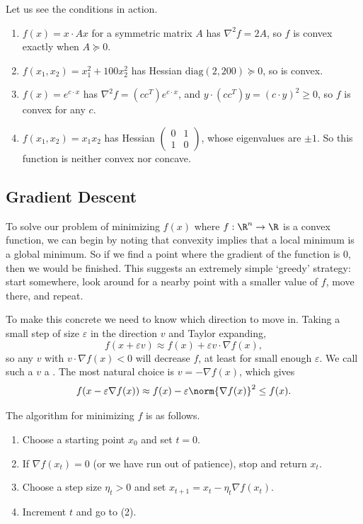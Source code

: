 \begin{example}
    Let us see the conditions in action.
    \begin{enumerate}[label=(\roman*)]
        \item $f(x) = x \cdot Ax$ for a symmetric matrix $A$ has $\nabla^2 f = 2A$, so $f$ is convex exactly when $A \succeq 0$.
        \item $f(x_1, x_2) = x_1^2 + 100 x_2^2$ has Hessian $\mathrm{diag}(2, 200) \succeq 0$, so is convex.
        \item $f(x) = e^{c \cdot x}$ has $\nabla^2 f = (cc^{T}) e^{c\cdot x}$, and $y \cdot (cc^T) y = (c \cdot y)^2 \geq 0$, so $f$ is convex for any $c$.
        \item $f(x_1, x_2) = x_1 x_2$ has Hessian $\begin{pmatrix} 0 & 1 \\ 1 & 0\end{pmatrix}$, whose eigenvalues are $\pm 1$. So this function is neither convex nor concave.
    \end{enumerate}
\end{example}

\subsection{Gradient Descent}

To solve our problem of minimizing $f(x)$ where $f : \R^n \rightarrow \R$ is a convex function, we can begin by noting that convexity implies that a local minimum is a global minimum. So if we find a point where the gradient of the function is $0$, then we would be finished. This suggests an extremely simple `greedy' strategy: start somewhere, look around for a nearby point with a smaller value of $f$, move there, and repeat.

To make this concrete we need to know which direction to move in. Taking a small step of size $\varepsilon$ in the direction $v$ and Taylor expanding,
$$
f(x + \varepsilon v) \approx f(x) + \varepsilon v \cdot \nabla f(x),
$$
so any $v$ with $v \cdot \nabla f(x) < 0$ will decrease $f$, at least for small enough $\varepsilon$. We call such a $v$ a . The most natural choice is $v = -\nabla f(x)$, which gives
$$
f(x - \varepsilon \nabla f(x)) \approx f(x) - \varepsilon \norm{\nabla f(x)}^2 \leq f(x).
$$

\begin{definition}
    The  algorithm for minimizing $f$ is as follows.
    \begin{enumerate}[label=(\arabic*)]
        \item Choose a starting point $x_0$ and set $t = 0$.
        \item If $\nabla f(x_t) = 0$ (or we have run out of patience), stop and return $x_t$.
        \item Choose a step size $\eta_t > 0$ and set $x_{t + 1} = x_t - \eta_t \nabla f(x_t)$.
        \item Increment $t$ and go to (2).
    \end{enumerate}
\end{definition}

